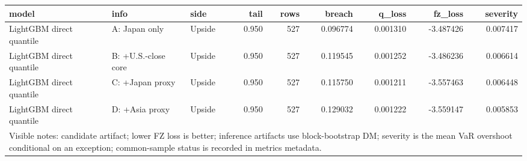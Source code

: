 \begin{tabular}{lllrrrrrr}
\toprule
model & info & side & tail & rows & breach & q_loss & fz_loss & severity \\
\midrule
LightGBM direct quantile & A: Japan only & Upside & 0.950 & 527 & 0.096774 & 0.001310 & -3.487426 & 0.007417 \\
LightGBM direct quantile & B: +U.S.-close core & Upside & 0.950 & 527 & 0.119545 & 0.001252 & -3.486236 & 0.006614 \\
LightGBM direct quantile & C: +Japan proxy & Upside & 0.950 & 527 & 0.115750 & 0.001211 & -3.557463 & 0.006448 \\
LightGBM direct quantile & D: +Asia proxy & Upside & 0.950 & 527 & 0.129032 & 0.001222 & -3.559147 & 0.005853 \\
\midrule
\multicolumn{9}{l}{\footnotesize Visible notes: candidate artifact; lower FZ loss is better; inference artifacts use block-bootstrap DM; severity is the mean VaR overshoot conditional on an exception; common-sample status is recorded in metrics metadata.} \\
\bottomrule
\end{tabular}
